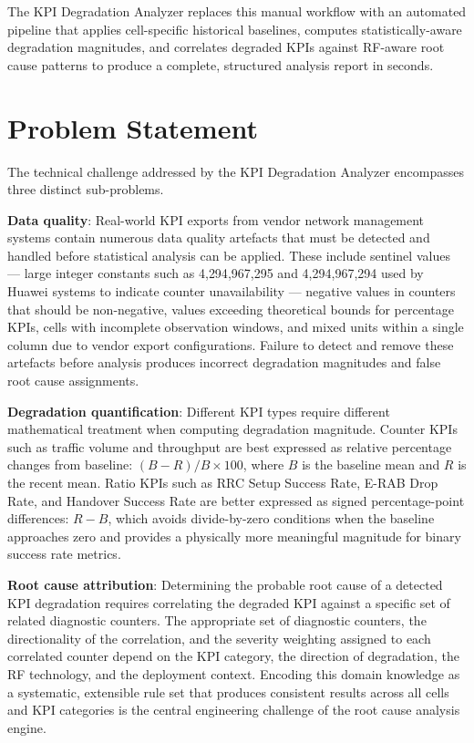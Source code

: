 The KPI Degradation Analyzer replaces this manual workflow with an automated pipeline that applies cell-specific historical baselines, computes statistically-aware degradation magnitudes, and correlates degraded KPIs against RF-aware root cause patterns to produce a complete, structured analysis report in seconds.

\section{Problem Statement}

The technical challenge addressed by the KPI Degradation Analyzer encompasses three distinct sub-problems.

\textbf{Data quality}: Real-world KPI exports from vendor network management systems contain numerous data quality artefacts that must be detected and handled before statistical analysis can be applied. These include sentinel values — large integer constants such as 4{,}294{,}967{,}295 and 4{,}294{,}967{,}294 used by Huawei systems to indicate counter unavailability — negative values in counters that should be non-negative, values exceeding theoretical bounds for percentage KPIs, cells with incomplete observation windows, and mixed units within a single column due to vendor export configurations. Failure to detect and remove these artefacts before analysis produces incorrect degradation magnitudes and false root cause assignments.

\textbf{Degradation quantification}: Different KPI types require different mathematical treatment when computing degradation magnitude. Counter KPIs such as traffic volume and throughput are best expressed as relative percentage changes from baseline: $(B - R) / B \times 100$, where $B$ is the baseline mean and $R$ is the recent mean. Ratio KPIs such as RRC Setup Success Rate, E-RAB Drop Rate, and Handover Success Rate are better expressed as signed percentage-point differences: $R - B$, which avoids divide-by-zero conditions when the baseline approaches zero and provides a physically more meaningful magnitude for binary success rate metrics.

\textbf{Root cause attribution}: Determining the probable root cause of a detected KPI degradation requires correlating the degraded KPI against a specific set of related diagnostic counters. The appropriate set of diagnostic counters, the directionality of the correlation, and the severity weighting assigned to each correlated counter depend on the KPI category, the direction of degradation, the RF technology, and the deployment context. Encoding this domain knowledge as a systematic, extensible rule set that produces consistent results across all cells and KPI categories is the central engineering challenge of the root cause analysis engine.

